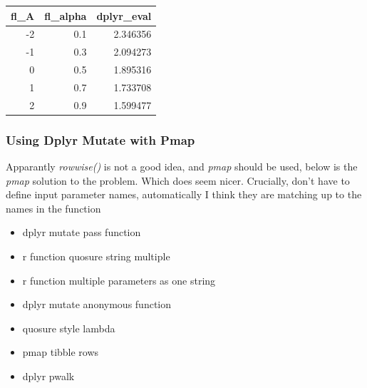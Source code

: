 \documentclass[
]{book}
\providecommand{\tightlist}{%
  \setlength{\itemsep}{0pt}\setlength{\parskip}{0pt}}
\begin{document}
\begin{table}[!h]
\centering
\begin{tabular}{r|r|r}
\hline
fl\_A & fl\_alpha & dplyr\_eval\\
\hline
\rowcolor{gray!6}  -2 & 0.1 & 2.346356\\
\hline
-1 & 0.3 & 2.094273\\
\hline
\rowcolor{gray!6}  0 & 0.5 & 1.895316\\
\hline
1 & 0.7 & 1.733708\\
\hline
\rowcolor{gray!6}  2 & 0.9 & 1.599477\\
\hline
\end{tabular}
\end{table}

\hypertarget{using-dplyr-mutate-with-pmap}{%
\subsubsection{Using Dplyr Mutate with Pmap}\label{using-dplyr-mutate-with-pmap}}

Apparantly \emph{rowwise()} is not a good idea, and \emph{pmap} should be used, below is the \emph{pmap} solution to the problem. Which does seem nicer. Crucially, don't have to define input parameter names, automatically I think they are matching up to the names in the function

\begin{itemize}
\tightlist
\item
  dplyr mutate pass function
\item
  r function quosure string multiple
\item
  r function multiple parameters as one string
\item
  dplyr mutate anonymous function
\item
  quosure style lambda
\item
  pmap tibble rows
\item
  dplyr pwalk
\end{itemize}
\end{document}
